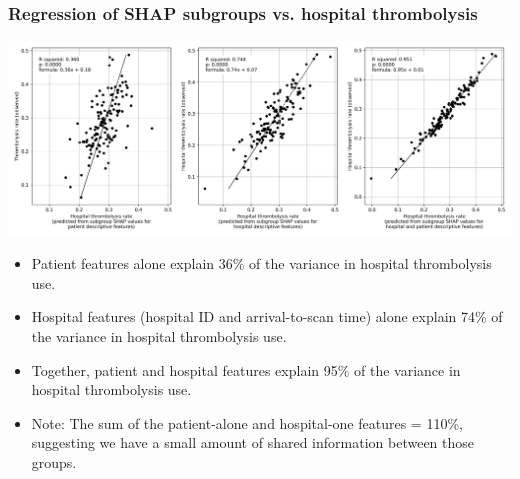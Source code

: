 \begin{frame}
\frametitle{Regression of SHAP subgroups vs. hospital thrombolysis}

\begin{center}
\includegraphics[width=1.0\textwidth]{./images/03e_xgb_10_features_multiple_regression_patient_hosptia_mean.jpg}
\end{center}

\scriptsize
\begin{itemize}
    \item Patient features alone explain 36\% of the variance in hospital thrombolysis use.
    \item Hospital features (hospital ID and arrival-to-scan time) alone explain 74\% of the variance in hospital thrombolysis use.
    \item Together, patient and hospital features explain 95\% of the variance in hospital thrombolysis use.
    \item Note: The sum of the patient-alone and hospital-one features = 110\%, suggesting we have a small amount of shared information between those groups.
\end{itemize}




 
\end{frame}